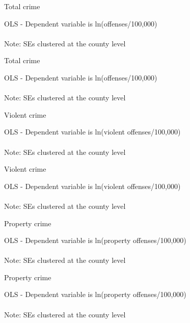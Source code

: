 \documentclass[xcolor=pdftex,dvipsnames,table]{beamer}
\newcommand{\tablesfolder}{/Users/bbiasi/Dropbox/Research/sanctuaries/sanctuaries_git/tex/tables}
\begin{document}
\begin{frame}{Total crime}
\footnotesize
\begin{center}
OLS - Dependent variable is ln(offenses/100,000)\\

\\\footnotesize{Note: SEs clustered at the county level}
\end{center}
\end{frame}

\begin{frame}{Total crime}
\footnotesize
\begin{center}
OLS - Dependent variable is ln(offenses/100,000)\\

\\\footnotesize{Note: SEs clustered at the county level}
\end{center}
\end{frame}

\begin{frame}{Violent crime}
\footnotesize
\begin{center}
OLS - Dependent variable is ln(violent offenses/100,000)\\

\\\footnotesize{Note: SEs clustered at the county level}
\end{center}
\end{frame}

\begin{frame}{Violent crime}
\footnotesize
\begin{center}
OLS - Dependent variable is ln(violent offenses/100,000)\\

\\\footnotesize{Note: SEs clustered at the county level}
\end{center}
\end{frame}

\begin{frame}{Property crime}
\footnotesize
\begin{center}
OLS - Dependent variable is ln(property offenses/100,000)\\

\\\footnotesize{Note: SEs clustered at the county level}
\end{center}
\end{frame}

\begin{frame}{Property crime}
\footnotesize
\begin{center}
OLS - Dependent variable is ln(property offenses/100,000)\\

\\\footnotesize{Note: SEs clustered at the county level}
\end{center}
\end{frame}
\end{document}
